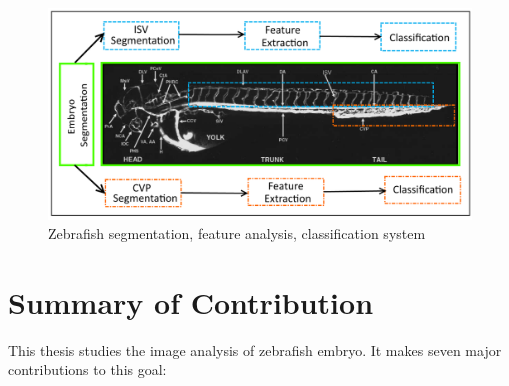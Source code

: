 \begin{landscape}
\begin{figure}[htb] 
 \begin{center}
    \includegraphics[scale=0.7]{figure/overview.png}
  \end{center}
  \caption[System Overview]{Zebrafish segmentation, feature analysis, classification system}
 \label{overview}
\end{figure}
\end{landscape}



\section{Summary of Contribution}
This thesis studies the image analysis of zebrafish embryo. It makes seven major contributions to this goal:

